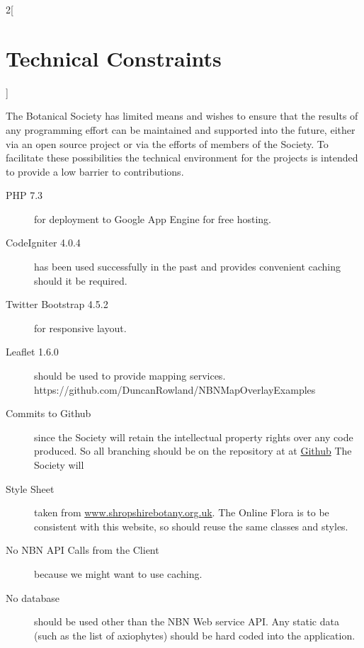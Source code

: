 \documentclass[a4paper,12pt,landscape]{article}
\begin{document}
\begin{multicols*}{2}[%
  \section{Technical Constraints}%
]


The Botanical Society has limited means
and wishes to ensure that the results of any programming effort
can be maintained and supported
into the future,
either via an open source project or via the efforts of members of the Society.
To facilitate these possibilities
the technical environment for the projects is intended 
to provide a low barrier to contributions.

\begin{description}
    \item[PHP 7.3] for deployment to Google App Engine for free hosting.
    \item[CodeIgniter 4.0.4] has been used successfully in the past and provides convenient caching should it be required.
    \item[Twitter Bootstrap 4.5.2] for responsive layout.
    \item[Leaflet 1.6.0] should be used to provide mapping services.
     https://github.com/DuncanRowland/NBNMapOverlayExamples
    \item[Commits to Github] since the Society will retain the intellectual property rights
      over any code produced.
      So all branching should be on the repository at
      at \href{https://github.com/joejcollins/captain-magenta.git}{Github}
      The Society will
    \item[Style Sheet] taken from \href{https://www.shropshirebotany.org.uk/}{www.shropshirebotany.org.uk}.
      The Online Flora is to be consistent with this website,
      so should reuse the same classes and styles.
    \item[No NBN API Calls from the Client] because we might want to use caching.
    \item[No database] should be used other than the NBN Web service API.
      Any static data 
      (such as the list of axiophytes)
      should be hard coded into the application.
\end{description}

\end{multicols*}
\end{document}
